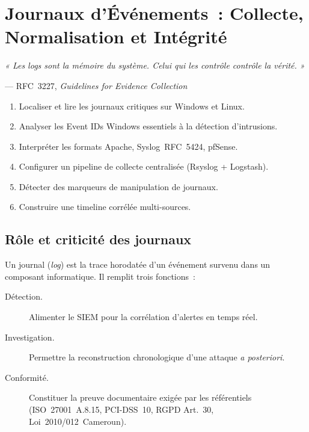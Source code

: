 \chapter{Journaux d'Événements~: Collecte, Normalisation et Intégrité}
\label{chap:logs}

\epigraph{\itshape « Les logs sont la mémoire du système.
  Celui qui les contrôle contrôle la vérité. »}
         {--- RFC~3227, \textit{Guidelines for Evidence Collection}}

\begin{boxobjectifs}
\begin{enumerate}
  \item Localiser et lire les journaux critiques sur Windows et Linux.
  \item Analyser les Event IDs Windows essentiels à la détection d'intrusions.
  \item Interpréter les formats Apache, Syslog~RFC~5424, pfSense.
  \item Configurer un pipeline de collecte centralisée (Rsyslog + Logstash).
  \item Détecter des marqueurs de manipulation de journaux.
  \item Construire une timeline corrélée multi-sources.
\end{enumerate}
\end{boxobjectifs}

\section{Rôle et criticité des journaux}
\label{sec:logs-role}

Un journal (\textit{log}) est la trace horodatée d'un événement survenu dans
un composant informatique. Il remplit trois fonctions~:

\begin{description}
  \item[Détection.] Alimenter le SIEM pour la corrélation d'alertes en temps réel.
  \item[Investigation.] Permettre la reconstruction chronologique d'une attaque
        \textit{a posteriori}.
  \item[Conformité.] Constituer la preuve documentaire exigée par les référentiels
        (ISO~27001~A.8.15, PCI-DSS~10, RGPD Art.~30, Loi~2010/012~Cameroun).
\end{description}

